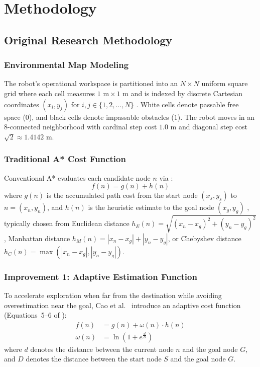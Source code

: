 \documentclass[conference]{IEEEtran}
\begin{document}
\section{Methodology}
\subsection{Original Research Methodology}
\subsubsection{Environmental Map Modeling}
The robot's operational workspace is partitioned into an $N \times N$ uniform square grid where each cell measures $1\text{ m} \times 1\text{ m}$ and is indexed by discrete Cartesian coordinates $(x_i, y_j)$ for $i, j \in \{1, 2, \dots, N\}$ \cite{wang2024toward}. White cells denote passable free space ($0$), and black cells denote impassable obstacles ($1$). The robot moves in an 8-connected neighborhood with cardinal step cost $1.0\text{ m}$ and diagonal step cost $\sqrt{2} \approx 1.4142\text{ m}$.

\subsubsection{Traditional A* Cost Function}
Conventional A* evaluates each candidate node $n$ via \cite{wu2024mobile}:
\begin{equation}
    f(n) = g(n) + h(n)
    \label{eq:trad_astar}
\end{equation}
where $g(n)$ is the accumulated path cost from the start node $(x_s, y_s)$ to $n=(x_n, y_n)$, and $h(n)$ is the heuristic estimate to the goal node $(x_g, y_g)$ \cite{liu2025improved}, typically chosen from Euclidean distance $h_E(n) = \sqrt{(x_n - x_g)^2 + (y_n - y_g)^2}$, Manhattan distance $h_M(n) = |x_n - x_g| + |y_n - y_g|$, or Chebyshev distance $h_C(n) = \max(|x_n - x_g|, |y_n - y_g|)$.

\subsubsection{Improvement 1: Adaptive Estimation Function}
To accelerate exploration when far from the destination while avoiding overestimation near the goal, Cao et al.~\cite{cao2026adaptive} introduce an adaptive cost function (Equations~5--6 of \cite{cao2026adaptive}):
\begin{align}
    f(n) &= g(n) + \omega(n) \cdot h(n) \label{eq:adap_f} \\
    \omega(n) &= \ln\left(1 + e^{\frac{d}{D}}\right) \label{eq:adap_w}
\end{align}
where $d$ denotes the distance between the current node $n$ and the goal node $G$, and $D$ denotes the distance between the start node $S$ and the goal node $G$.
\end{document}

